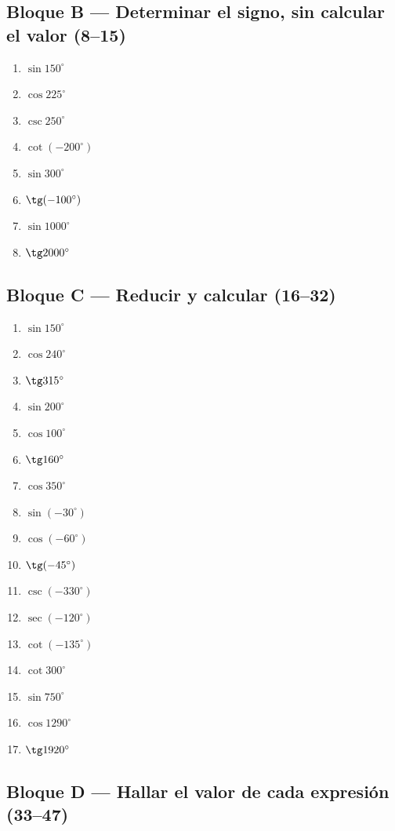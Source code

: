 \documentclass[12pt, letterpaper]{article}
\providecommand{\sen}{\sin}
\begin{document}
\subsection*{Bloque B — Determinar el signo, sin calcular el valor (8--15)}

\begin{enumerate}[leftmargin=*, label=\textbf{\arabic*.}, start=8]
  \item $\sen 150^\circ$
  \item $\cos 225^\circ$
  \item $\csc 250^\circ$
  \item $\cot(-200^\circ)$
  \item $\sen 300^\circ$
  \item $\tg(-100^\circ)$
  \item $\sen 1000^\circ$
  \item $\tg 2000^\circ$
\end{enumerate}

\newpage
\subsection*{Bloque C — Reducir y calcular (16--32)}

\begin{enumerate}[leftmargin=*, label=\textbf{\arabic*.}, start=16]
  \item $\sen 150^\circ$
  \item $\cos 240^\circ$
  \item $\tg 315^\circ$
  \item $\sen 200^\circ$
  \item $\cos 100^\circ$
  \item $\tg 160^\circ$
  \item $\cos 350^\circ$
  \item $\sen(-30^\circ)$
  \item $\cos(-60^\circ)$
  \item $\tg(-45^\circ)$
  \item $\csc(-330^\circ)$
  \item $\sec(-120^\circ)$
  \item $\cot(-135^\circ)$
  \item $\cot 300^\circ$
  \item $\sen 750^\circ$
  \item $\cos 1290^\circ$
  \item $\tg 1920^\circ$
\end{enumerate}

\newpage
\subsection*{Bloque D — Hallar el valor de cada expresión (33--47)}
\end{document}
